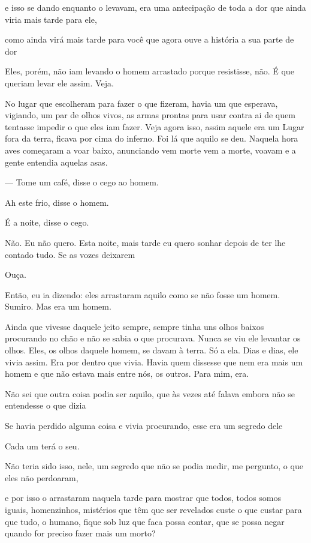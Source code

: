 e isso se dando enquanto o levavam, era uma antecipação de toda a dor
que ainda viria mais tarde para ele,

como ainda virá mais tarde para você que agora ouve a história a sua
parte de dor

Eles, porém, não iam levando o homem arrastado porque resistisse, não. É
que queriam levar ele assim. Veja.

No lugar que escolheram para fazer o que fizeram, havia um que esperava,
vigiando, um par de olhos vivos, as armas prontas para usar contra ai de
quem tentasse impedir o que eles iam fazer. Veja agora isso, assim
aquele era um Lugar fora da terra, ficava por cima do inferno. Foi lá
que aquilo se deu. Naquela hora aves começaram a voar baixo, anunciando
vem morte vem a morte, voavam e a gente entendia aquelas asas.

--- Tome um café, disse o cego ao homem.

Ah este frio, disse o homem.

É a noite, disse o cego.

Não. Eu não quero. Esta noite, mais tarde eu quero sonhar depois de ter
lhe contado tudo. Se as vozes deixarem

Ouça.

Então, eu ia dizendo: eles arrastaram aquilo como se não fosse um homem.
Sumiro. Mas era um homem.

Ainda que vivesse daquele jeito sempre, sempre tinha uns olhos baixos
procurando no chão e não se sabia o que procurava. Nunca se viu ele
levantar os olhos. Eles, os olhos daquele homem, se davam à terra. Só a
ela. Dias e dias, ele vivia assim. Era por dentro que vivia. Havia quem
dissesse que nem era mais um homem e que não estava mais entre nós, os
outros. Para mim, era.

Não sei que outra coisa podia ser aquilo, que às vezes até falava embora
não se entendesse o que dizia

Se havia perdido alguma coisa e vivia procurando, esse era um segredo
dele

Cada um terá o seu.

Não teria sido isso, nele, um segredo que não se podia medir, me
pergunto, o que eles não perdoaram,

e por isso o arrastaram naquela tarde para mostrar que todos, todos
somos iguais, homenzinhos, mistérios que têm que ser revelados custe o
que custar para que tudo, o humano, fique sob luz que faca possa contar,
que se possa negar quando for preciso fazer mais um morto?

